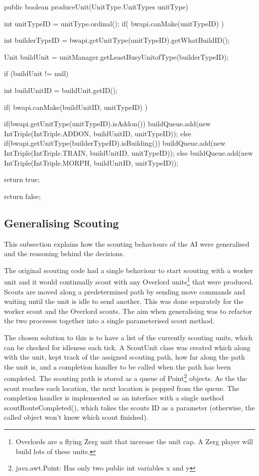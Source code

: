 \documentclass[11pt,openright,a4paper]{report}
\begin{document}
\begin{Code}[frame=single,language=Java,tabsize=4,breaklines,breakatwhitespace,caption={The current method to produce any unit in the game. IntTriple is a custom type that simply contains three public integers.},label=produceUnit]
public boolean produceUnit(UnitType.UnitTypes unitType){
	int unitTypeID = unitType.ordinal();
	if( bwapi.canMake(unitTypeID) ){
		int builderTypeID = bwapi.getUnitType(unitTypeID).getWhatBuildID();
		
        Unit buildUnit = unitManager.getLeastBusyUnitofType(builderTypeID);
		
		if (buildUnit != null){
			int buildUnitID = buildUnit.getID();
			
			if( bwapi.canMake(buildUnitID, unitTypeID) ){					
				if(bwapi.getUnitType(unitTypeID).isAddon()){
					buildQueue.add(new IntTriple(IntTriple.ADDON, buildUnitID, unitTypeID));
				}
				else if(bwapi.getUnitType(builderTypeID).isBuilding()){
					buildQueue.add(new IntTriple(IntTriple.TRAIN, buildUnitID, unitTypeID));
				}
				else{
					buildQueue.add(new IntTriple(IntTriple.MORPH, buildUnitID, unitTypeID));
				}
				
				return true;
			}
		}
	}
	return false;
}
\end{Code}

\subsection{Generalising Scouting}
This subsection explains how the scouting behaviours of the AI were generalised and the reasoning behind the decisions.

The original scouting code had a single behaviour to start scouting with a worker unit and it would continually scout with any Overlord units\footnote{Overlords are a flying Zerg unit that increase the unit cap. A Zerg player will build lots of these units.} that were produced. Scouts are moved along a predetermined path by sending move commands and waiting until the unit is idle to send another. This was done separately for the worker scout and the Overlord scouts. The aim when generalising was to refactor the two processes together into a single parameterised scout method.

The chosen solution to this is to have a list of the currently scouting units, which can be checked for idleness each tick. A ScoutUnit class was created which along with the unit, kept track of the assigned scouting path, how far along the path the unit is, and a completion handler to be called when the path has been completed. The scouting path is stored as a queue of Point\footnote{java.awt.Point: Has only two public int variables x and y} objects. As the the scout reaches each location, the next location is popped from the queue. The completion handler is implemented as an interface with a single method scoutRouteCompleted(), which takes the scouts ID as a parameter (otherwise, the called object won't know which scout finished).
\end{document}

